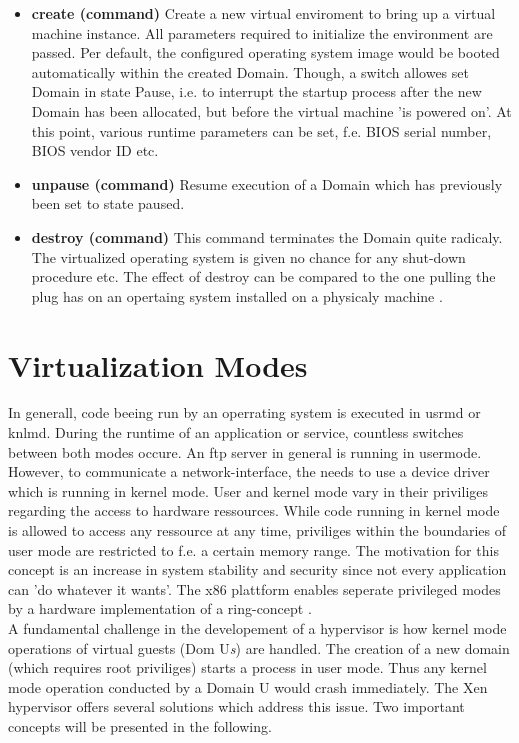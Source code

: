 \begin{itemize}
	\item \textbf{create (command)} Create a new virtual enviroment to bring up a virtual machine instance. All parameters required to initialize the environment are passed. Per default, the configured operating system image would be booted automatically within the created Domain. Though, a switch allowes set Domain in state Pause, i.e. to interrupt the startup process after the new Domain has been allocated, but before the virtual machine 'is powered on'. At this point, various runtime parameters can be set, f.e. BIOS serial number, BIOS vendor ID etc.
	\item \textbf{unpause (command)} Resume execution of a Domain which has previously been set to state paused.
	\item \textbf{destroy (command)} This command terminates the Domain quite radicaly. The virtualized operating system is given no chance for any shut-down procedure etc. The effect of destroy can be compared to the one pulling the plug has on an opertaing system installed on a physicaly machine \cite{xenxl}.
\end{itemize}

\section{Virtualization Modes}
In generall, code beeing run by an operrating system is executed in \gls{usrmd} or \gls{knlmd}. During the runtime of an application or service, countless switches between both modes occure. An ftp server in general is running in usermode. However, to communicate a network-interface, the needs to use a device driver which is running in kernel mode. User and kernel mode vary in their priviliges regarding the access to hardware ressources. While code running in kernel mode is allowed to access any ressource at any time, priviliges within the boundaries of user mode are restricted to f.e. a certain memory range. The motivation for this concept is an increase in system stability and security since not every application can 'do whatever it wants'. The x86 plattform enables seperate privileged modes by a hardware implementation of a ring-concept \cite{guide2017intel}.\\
A fundamental challenge in the developement of a hypervisor is how kernel mode operations of virtual guests (Dom U{\small \textit{s}}) are handled. The creation of a new domain (which requires \gls{root} priviliges) starts a process in user mode. Thus any kernel mode operation conducted by a Domain U would crash immediately. The Xen hypervisor offers several solutions which address this issue. Two important concepts will be presented in the following.  

